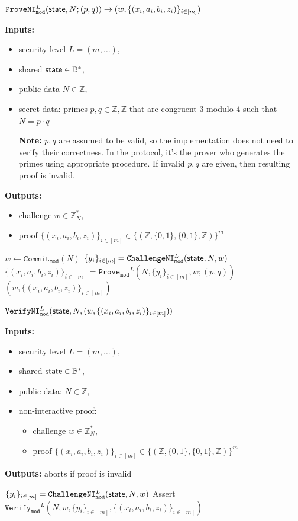 \documentclass[11pt]{article}
\newenvironment{inlineAlgorithm}{}{}
\newcommand{\algoName}[1]{#1 \par}
\newcommand{\algoInputsList}[1]{
    {\small \bf Inputs:} 
        \begin{itemize}[noitemsep,topsep=0pt]
            #1
        \end{itemize}
}
\newcommand{\algoOutputs}[1]{
    {\small \bf Outputs:} #1 \par
}
\newcommand{\algoOutputsList}[1]{
    {\small \bf Outputs:}
        \begin{itemize}[noitemsep,topsep=0pt]
            #1
        \end{itemize}
}
\def\state{{\sf state}}
\newcommand{\commit}[1]{\ensuremath{\mathtt{Commit}_{\mathtt{#1}}}}
\newcommand{\challengeni}[1]{\ensuremath{\mathtt{ChallengeNI}_{\mathtt{#1}}}}
\newcommand{\prove}[1]{\ensuremath{\mathtt{Prove}_{\mathtt{#1}}}}
\newcommand{\proveni}[1]{\ensuremath{\mathtt{ProveNI}_{\mathtt{#1}}}}
\newcommand{\verify}[1]{\ensuremath{\mathtt{Verify}_{\mathtt{#1}}}}
\newcommand{\verifyni}[1]{\ensuremath{\mathtt{VerifyNI}_{\mathtt{#1}}}}
\newcommand{\Z}{\mathbb{Z}}
\newcommand{\?}[1]{\stackrel{?}{#1}}
\newcommand{\Bit}{\ensuremath{\{0{,}1\}}}
\newcommand{\Byte}{\ensuremath{\mathbb{B}}}
\begin{document}
\begin{description}

\item
\begin{inlineAlgorithm}
\algoName{$\proveni{mod}^L(\state, N; (p, q)) \to (w, \{(x_i, a_i, b_i, z_i)\}_{i\in[m]})$}
\algoInputsList{
    \item security level $L = (m, \dots)$,
    \item shared $\state \in \Byte^*$,
    \item public data $N \in \Z$,
    \item secret data: primes $p,q \in \Z,\Z$ that are congruent 3 modulo 4 such that $N = p \cdot q$

    {\bf Note:} $p, q$ are assumed to be valid, so the implementation does not need to verify their correctness. In the protocol, it's the prover who generates the primes using appropriate procedure. If invalid $p, q$ are given, then resulting proof is invalid.
}
\algoOutputsList{
    \item challenge $w \in \Z^*_N$,
    \item proof $\{(x_i, a_i, b_i, z_i)\}_{i\in[m]} \in \{(\Z, \Bit, \Bit, \Z)\}^m$
}
\begin{algorithmic}[1]
\State $w \gets \commit{mod}(N)$
\State $\{y_i\}_{i\in[m]} = \challengeni{mod}^L(\state, N, w)$
\State $\{(x_i, a_i, b_i, z_i)\}_{i\in[m]} = \prove{mod}^L(N, \{y_i\}_{i\in[m]}, w; (p, q))$
\State \Return $(w, \{(x_i, a_i, b_i, z_i)\}_{i\in[m]})$
\end{algorithmic}
\end{inlineAlgorithm}

\item
\begin{inlineAlgorithm}
\algoName{$\verifyni{mod}^L(\state, N, (w, \{(x_i, a_i, b_i, z_i)\}_{i\in[m]}))$}
\algoInputsList{
    \item security level $L = (m, \dots)$,
    \item shared $\state \in \Byte^*$,
    \item public data: $N \in \Z$,
    \item non-interactive proof:
        \begin{itemize}
        \item challenge $w \in \Z^*_N$,
        \item proof $\{(x_i, a_i, b_i, z_i)\}_{i\in[m]} \in \{(\Z, \Bit, \Bit, \Z)\}^m$
        \end{itemize}
}
\algoOutputs{aborts if proof is invalid}
\begin{algorithmic}[1]
\State $\{y_i\}_{i\in[m]} = \challengeni{mod}^L(\state, N, w)$
\State Assert $\verify{mod}^L(N, w, \{y_i\}_{i\in[m]}, \{(x_i, a_i, b_i, z_i)\}_{i\in[m]})$
\end{algorithmic}
\end{inlineAlgorithm}

\end{description}
\end{document}
